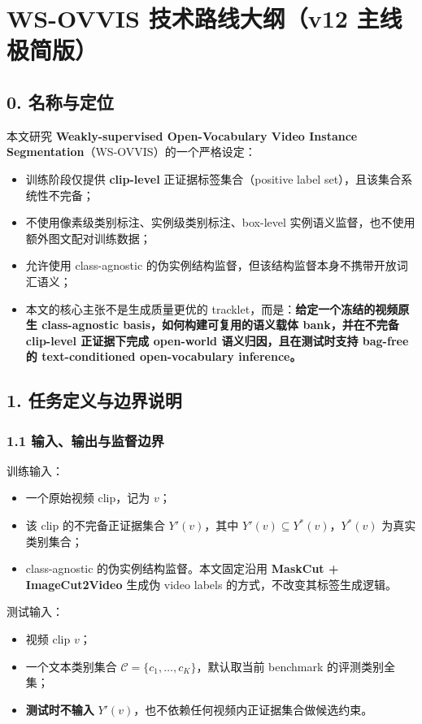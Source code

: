 \documentclass[UTF8]{ctexart}
\begin{document}
\section*{WS-OVVIS 技术路线大纲（v12 主线极简版）}

\subsection*{0. 名称与定位}
本文研究 \textbf{Weakly-supervised Open-Vocabulary Video Instance Segmentation}（WS-OVVIS）的一个严格设定：
\begin{itemize}
\item 训练阶段仅提供 \textbf{clip-level} 正证据标签集合（positive label set），且该集合系统性不完备；
\item 不使用像素级类别标注、实例级类别标注、box-level 实例语义监督，也不使用额外图文配对训练数据；
\item 允许使用 class-agnostic 的伪实例结构监督，但该结构监督本身不携带开放词汇语义；
\item 本文的核心主张不是生成质量更优的 tracklet，而是：\textbf{给定一个冻结的视频原生 class-agnostic basis，如何构建可复用的语义载体 bank，并在不完备 clip-level 正证据下完成 open-world 语义归因，且在测试时支持 bag-free 的 text-conditioned open-vocabulary inference。}
\end{itemize}

\par\noindent\hrulefill\par

\subsection*{1. 任务定义与边界说明}

\subsubsection*{1.1 输入、输出与监督边界}
训练输入：
\begin{itemize}
\item 一个原始视频 clip，记为 $v$；
\item 该 clip 的不完备正证据集合 $Y'(v)$，其中 $Y'(v)\subseteq Y^*(v)$，$Y^*(v)$ 为真实类别集合；
\item class-agnostic 的伪实例结构监督。本文固定沿用 \textbf{MaskCut + ImageCut2Video} 生成伪 video labels 的方式，不改变其标签生成逻辑。
\end{itemize}

测试输入：
\begin{itemize}
\item 视频 clip $v$；
\item 一个文本类别集合 $\mathcal C = \{c_1,\dots,c_K\}$，默认取当前 benchmark 的评测类别全集；
\item \textbf{测试时不输入} $Y'(v)$，也不依赖任何视频内正证据集合做候选约束。
\end{itemize}
\end{document}
